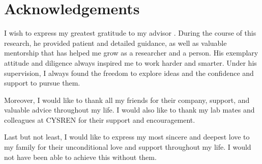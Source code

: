 \chapter*{Acknowledgements}

\begin{flushleft}

  I wish to express my greatest gratitude to my advisor \supervisorname. During the course of this research, he provided patient and detailed guidance, as well as valuable mentorship that has helped me grow as a researcher and a person. His exemplary attitude and diligence always inspired me to work harder and smarter. Under his supervision, I always found the freedom to explore ideas and the confidence and support to pursue them.

  Moreover, I would like to thank all my friends for their company, support, and valuable advice throughout my life. I would also like to thank my lab mates and colleagues at CYSREN for their support and encouragement.

  Last but not least, I would like to express my most sincere and deepest love to my family for their unconditional love and support throughout my life. I would not have been able to achieve this without them.

\end{flushleft}
